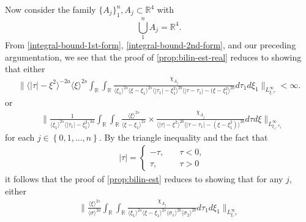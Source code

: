 \documentclass[12pt,reqno]{amsart}
\numberwithin{equation}{section}  %
\numberwithin{figure}{section}
\newcommand{\rr}{\mathbb{R}}
\theoremstyle{plain}
\theoremstyle{definition}
\theoremstyle{remark}
\begin{document}
%
%
Now consider the family $\{A_{j}\}_{1}^{n}, A_{j} \subset \rr^{4}$ with
$$\bigcup_{1}^{n} A_{j}= \rr^{4}.$$ From \eqref{integral-bound-1st-form},
\eqref{integral-bound-2nd-form}, and our preceding argumentation,
we see that the proof of \autoref{prop:bilin-est-real} reduces to showing that
either 
%
%
%
%
\begin{equation}
  \label{key-sup-estimate-real}
  \begin{split}
     \| \langle | \tau | - \xi^{2} \rangle ^{-2a} \langle \xi
    \rangle ^{2s}
    \int_{\rr} \int_{\rr} \frac{\chi_{A_{j}}}{ \langle \xi_{1} \rangle ^{2s} \langle
\xi-\xi_{1} \rangle ^{2s} \langle | \tau_{1}|-\xi_{1}^{2} \rangle^{2b}  \langle  |\tau -
    \tau_{1} | -(\xi - \xi_{1}^{2}
    \rangle ^{2b} } d \tau_1 d \xi_{1} \|_{L^\infty_{\xi, \tau}} < \infty.
  \end{split}
\end{equation}
%
or
\begin{equation}
\begin{split}
  & \| \frac{1}{\langle \xi_{1} \rangle ^{2s}
  \langle | \tau_{1} | - \xi_{1}^{2} \rangle
  ^{2a}} \int_{\rr} \int_{\rr} \frac{\langle \xi \rangle ^{2s}}{\langle
  \xi - \xi_{1}\rangle ^{2s}}  \times \frac{\chi_{A_{j}}}{\langle | \tau | - \xi^{2} \rangle ^{2b} \langle | \tau -
  \tau_{1} | - (\xi - \xi_{1}^{2}) \rangle ^{2b}} d \tau d \xi
  \|_{L^{\infty}_{\xi_{1}, \tau_{1}}}
\end{split}
\end{equation}
for each $j \in \left\{ 0,1,\dots,n \right\}$. 
By the triangle inequality and the fact that 
%
%
\begin{equation*}
\begin{split}
& | \tau | =
\begin{cases}
  - \tau, \quad & \tau < 0, 
\\
\tau, \quad & \tau > 0
\end{cases}
\end{split}
\end{equation*}
%
%
it follows that the proof of \autoref{prop:bilin-est} reduces to showing that
for any $j$, either 
%
%
\begin{equation}
  \label{sup-est-gen-real-1}
  \begin{split}
    \| \frac{ \langle \xi
    \rangle ^{2s}}{\langle \sigma \rangle ^{2a}}
    \int_{\rr} \int_{\rr} \frac{\chi_{A_{j}}}{ \langle \xi_{1} \rangle ^{2s} \langle \xi-\xi_{1} \rangle ^{2s} 
    \langle \sigma_{1} \rangle^{2b} \langle  \sigma_{2} \rangle^{2b} }
    d \tau_1 d \xi_{1} \|_{L^{\infty}_{\xi, \tau}}
  \end{split}
\end{equation}
\end{document}
